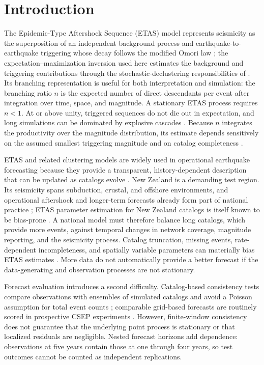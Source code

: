 \documentclass[12pt]{article}
\begin{document}
\section*{Introduction}

The Epidemic-Type Aftershock Sequence (ETAS) model represents seismicity as the
superposition of an independent background process and earthquake-to-earthquake
triggering whose decay follows the modified Omori law
\citep{Ogata1988,Ogata1998,Utsu1995,Console2003}; the expectation--maximization
inversion used here estimates the background and triggering contributions through
the stochastic-declustering responsibilities of \citet{Zhuang2002}. Its branching
representation is useful
for both interpretation and simulation: the branching ratio $n$ is the expected
number of direct descendants per event after integration over time, space, and
magnitude. A stationary ETAS process requires $n<1$. At or above unity,
triggered sequences do not die out in expectation, and long simulations can be
dominated by explosive cascades \citep{Helmstetter2002}. Because $n$ integrates
the productivity over the magnitude distribution, its estimate depends sensitively
on the assumed smallest triggering magnitude and on catalog completeness
\citep{SornetteWerner2005}.

ETAS and related clustering models are widely used in operational earthquake
forecasting because they provide a transparent, history-dependent description
that can be updated as catalogs evolve
\citep{Jordan2011,Mizrahi2024,Toda2005,Field2017}. New Zealand is a demanding
test region. Its seismicity spans subduction, crustal, and offshore environments,
and operational aftershock and longer-term forecasts already form part of
national practice \citep{Gerstenberger2024,RhoadesEvison2004,Rhoades2021}; ETAS parameter
estimation for New Zealand catalogs is itself known to be bias-prone
\citep{Harte2013}. A national model must therefore balance long
catalogs, which provide more events, against temporal changes in network
coverage, magnitude reporting, and the seismicity process. Catalog truncation,
missing events, rate-dependent incompleteness, and spatially variable parameters
can materially bias ETAS estimates
\citep{Seif2017,Mizrahi2021b,Hainzl2016,Nandan2017}. More data do not
automatically provide a better forecast if the data-generating and observation
processes are not stationary.

Forecast evaluation introduces a second difficulty. Catalog-based consistency
tests compare observations with ensembles of simulated catalogs and avoid a
Poisson assumption for total event counts
\citep{Rhoades2011,Savran2022,Schorlemmer2007}; comparable grid-based forecasts
are routinely scored in prospective CSEP experiments
\citep{Werner2011,KaganJackson2011,Taroni2018}.
However, finite-window consistency does not guarantee that the underlying point
process is stationary or that localized residuals are negligible. Nested
forecast horizons add dependence: observations at
five years contain those at one through four years, so test outcomes cannot be
counted as independent replications.
\end{document}
